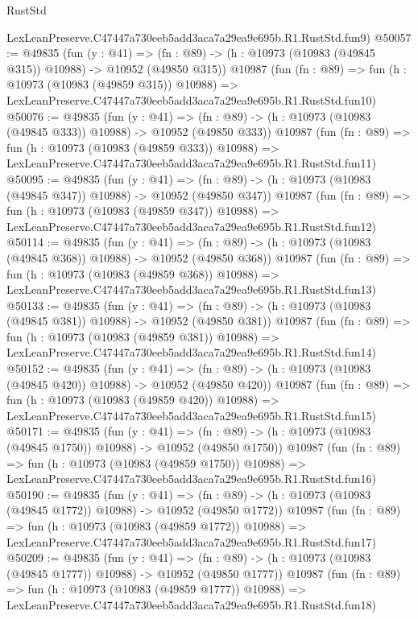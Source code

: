 \begin{lexlean}{RustStd}
\begin{coremodule}
    LexLeanPreserve.C47447a730eeb5add3aca7a29ea9e695b.R1.RustStd.fun9)
@50057 := @49835
    (fun (y : @41) =>
    (fn : @89) -> (h : @10973 (@10983 (@49845 @315)) @10988) -> @10952 (@49850 @315))
    @10987
    (fun (fn : @89) =>
    fun (h : @10973 (@10983 (@49859 @315)) @10988) =>
    LexLeanPreserve.C47447a730eeb5add3aca7a29ea9e695b.R1.RustStd.fun10)
@50076 := @49835
    (fun (y : @41) =>
    (fn : @89) -> (h : @10973 (@10983 (@49845 @333)) @10988) -> @10952 (@49850 @333))
    @10987
    (fun (fn : @89) =>
    fun (h : @10973 (@10983 (@49859 @333)) @10988) =>
    LexLeanPreserve.C47447a730eeb5add3aca7a29ea9e695b.R1.RustStd.fun11)
@50095 := @49835
    (fun (y : @41) =>
    (fn : @89) -> (h : @10973 (@10983 (@49845 @347)) @10988) -> @10952 (@49850 @347))
    @10987
    (fun (fn : @89) =>
    fun (h : @10973 (@10983 (@49859 @347)) @10988) =>
    LexLeanPreserve.C47447a730eeb5add3aca7a29ea9e695b.R1.RustStd.fun12)
@50114 := @49835
    (fun (y : @41) =>
    (fn : @89) -> (h : @10973 (@10983 (@49845 @368)) @10988) -> @10952 (@49850 @368))
    @10987
    (fun (fn : @89) =>
    fun (h : @10973 (@10983 (@49859 @368)) @10988) =>
    LexLeanPreserve.C47447a730eeb5add3aca7a29ea9e695b.R1.RustStd.fun13)
@50133 := @49835
    (fun (y : @41) =>
    (fn : @89) -> (h : @10973 (@10983 (@49845 @381)) @10988) -> @10952 (@49850 @381))
    @10987
    (fun (fn : @89) =>
    fun (h : @10973 (@10983 (@49859 @381)) @10988) =>
    LexLeanPreserve.C47447a730eeb5add3aca7a29ea9e695b.R1.RustStd.fun14)
@50152 := @49835
    (fun (y : @41) =>
    (fn : @89) -> (h : @10973 (@10983 (@49845 @420)) @10988) -> @10952 (@49850 @420))
    @10987
    (fun (fn : @89) =>
    fun (h : @10973 (@10983 (@49859 @420)) @10988) =>
    LexLeanPreserve.C47447a730eeb5add3aca7a29ea9e695b.R1.RustStd.fun15)
@50171 := @49835
    (fun (y : @41) =>
    (fn : @89) -> (h : @10973 (@10983 (@49845 @1750)) @10988) -> @10952 (@49850 @1750))
    @10987
    (fun (fn : @89) =>
    fun (h : @10973 (@10983 (@49859 @1750)) @10988) =>
    LexLeanPreserve.C47447a730eeb5add3aca7a29ea9e695b.R1.RustStd.fun16)
@50190 := @49835
    (fun (y : @41) =>
    (fn : @89) -> (h : @10973 (@10983 (@49845 @1772)) @10988) -> @10952 (@49850 @1772))
    @10987
    (fun (fn : @89) =>
    fun (h : @10973 (@10983 (@49859 @1772)) @10988) =>
    LexLeanPreserve.C47447a730eeb5add3aca7a29ea9e695b.R1.RustStd.fun17)
@50209 := @49835
    (fun (y : @41) =>
    (fn : @89) -> (h : @10973 (@10983 (@49845 @1777)) @10988) -> @10952 (@49850 @1777))
    @10987
    (fun (fn : @89) =>
    fun (h : @10973 (@10983 (@49859 @1777)) @10988) =>
    LexLeanPreserve.C47447a730eeb5add3aca7a29ea9e695b.R1.RustStd.fun18)

\end{coremodule}
\end{lexlean}
